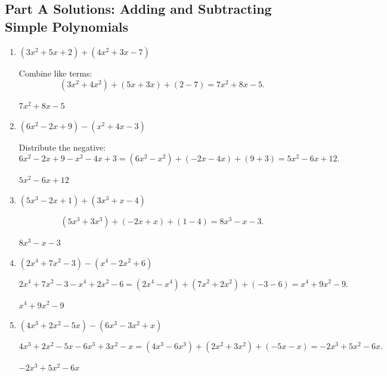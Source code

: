 \documentclass[14pt]{extarticle}
\begin{document}
\subsection*{Part A Solutions: Adding and Subtracting Simple Polynomials}
\begin{enumerate}
  \item \((3x^2 + 5x + 2) + (4x^2 + 3x - 7)\)

  Combine like terms:
  \[
  (3x^2 + 4x^2) + (5x + 3x) + (2 - 7)
  = 7x^2 + 8x - 5.
  \]

  \(\boxed{7x^2 + 8x - 5}\)

  \item \((6x^2 - 2x + 9) - (x^2 + 4x - 3)\)

  Distribute the negative:
  \[
  6x^2 - 2x + 9 - x^2 - 4x + 3
  = (6x^2 - x^2) + (-2x - 4x) + (9 + 3)
  = 5x^2 - 6x + 12.
  \]

  \(\boxed{5x^2 - 6x + 12}\)

  \item \((5x^3 - 2x + 1) + (3x^3 + x - 4)\)

  \[
  (5x^3 + 3x^3) + (-2x + x) + (1 - 4)
  = 8x^3 - x - 3.
  \]

  \(\boxed{8x^3 - x - 3}\)

  \item \((2x^4 + 7x^2 - 3) - (x^4 - 2x^2 + 6)\)

  \[
  2x^4 + 7x^2 - 3 - x^4 + 2x^2 - 6
  = (2x^4 - x^4) + (7x^2 + 2x^2) + (-3 - 6)
  = x^4 + 9x^2 - 9.
  \]

  \(\boxed{x^4 + 9x^2 - 9}\)

  \item \((4x^3 + 2x^2 - 5x) - (6x^3 - 3x^2 + x)\)

  \[
  4x^3 + 2x^2 - 5x - 6x^3 + 3x^2 - x
  = (4x^3 - 6x^3) + (2x^2 + 3x^2) + (-5x - x)
  = -2x^3 + 5x^2 - 6x.
  \]

  \(\boxed{-2x^3 + 5x^2 - 6x}\)
\end{enumerate}
\end{document}
